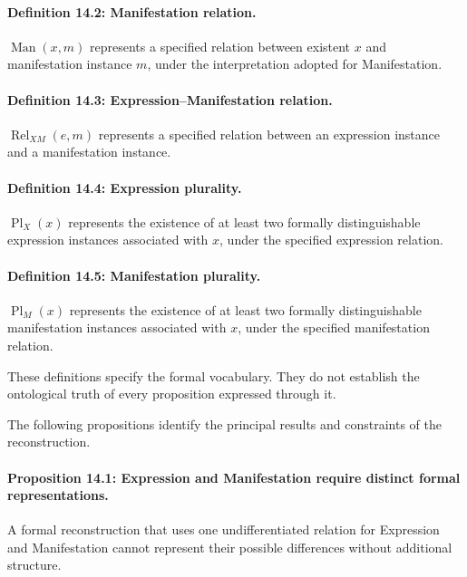 \paragraph{Definition 14.2: Manifestation relation.}

\(\operatorname{Man}(x,m)\)
represents a specified
relation between existent
\(x\) and manifestation
instance \(m\), under
the interpretation adopted
for Manifestation.

\paragraph{Definition 14.3: Expression--Manifestation relation.}

\(\operatorname{Rel}_{XM}(e,m)\)
represents a specified
relation between an
expression instance and
a manifestation instance.

\paragraph{Definition 14.4: Expression plurality.}

\(\operatorname{Pl}_{X}(x)\)
represents the existence
of at least two formally
distinguishable expression
instances associated with
\(x\), under the specified
expression relation.

\paragraph{Definition 14.5: Manifestation plurality.}

\(\operatorname{Pl}_{M}(x)\)
represents the existence
of at least two formally
distinguishable manifestation
instances associated with
\(x\), under the specified
manifestation relation.

These definitions specify
the formal vocabulary.
They do not establish
the ontological truth
of every proposition
expressed through it.

The following propositions
identify the principal
results and constraints
of the reconstruction.

\paragraph{Proposition 14.1: Expression and Manifestation require distinct formal representations.}

A formal reconstruction
that uses one undifferentiated
relation for Expression
and Manifestation cannot
represent their possible
differences without
additional structure.

